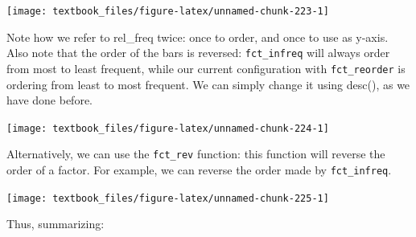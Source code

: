 \documentclass[]{tufte-book}
\newenvironment{Shaded}{}{}
\newcommand{\DataTypeTok}[1]{\textcolor[rgb]{0.56,0.13,0.00}{#1}}
\newcommand{\KeywordTok}[1]{\textcolor[rgb]{0.00,0.44,0.13}{\textbf{#1}}}
\newcommand{\NormalTok}[1]{#1}
\newcommand{\OperatorTok}[1]{\textcolor[rgb]{0.40,0.40,0.40}{#1}}
\newcommand{\StringTok}[1]{\textcolor[rgb]{0.25,0.44,0.63}{#1}}
\begin{document}
\texttt{[image: textbook\_files/figure-latex/unnamed-chunk-223-1]}

Note how we refer to rel\_freq twice: once to order, and once to use as y-axis. Also note that the order of the bars is reversed: \texttt{fct\_infreq} will always order from most to least frequent, while our current configuration with \texttt{fct\_reorder} is ordering from least to most frequent. We can simply change it using desc(), as we have done before.

\begin{Shaded}
\end{Shaded}

\texttt{[image: textbook\_files/figure-latex/unnamed-chunk-224-1]}

Alternatively, we can use the \texttt{fct\_rev} function: this function will reverse the order of a factor. For example, we can reverse the order made by \texttt{fct\_infreq}.

\begin{Shaded}
\end{Shaded}

\texttt{[image: textbook\_files/figure-latex/unnamed-chunk-225-1]}

Thus, summarizing:
\end{document}

